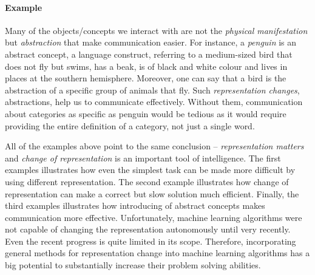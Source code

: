 \paragraph{Example} 
Many of the objects/concepts we interact with are not the \textit{physical manifestation} but \textit{abstraction} that make communication easier.
For instance, a \textit{penguin} is an abstract concept, a language construct, referring to a medium-sized bird that does not fly but swims, has a beak, is of black and white colour and lives in places at the southern hemisphere.
Moreover, one can say that a bird is the abstraction of a specific group of animals that fly.
Such \textit{representation changes}, abstractions, help us to communicate effectively.
Without them, communication about categories as specific as penguin would be tedious as it would  require providing the entire definition of a category, not just a single word.




All of the examples above point to the same conclusion -- \textit{representation matters} and \textit{change of representation} is an important tool of intelligence.
The first examples illustrates how even the simplest task can be made more difficult by using different representation.
The second example illustrates how change of representation can make a correct but slow solution much efficient.
Finally, the third examples illustrates how introducing of abstract concepts makes communication more effective.
Unfortunately, machine learning algorithms were not capable of changing the representation autonomously until very recently.
Even the recent progress is quite limited in its scope.
Therefore, incorporating general methods for representation change into machine learning algorithms has a big potential to substantially increase their problem solving abilities.






